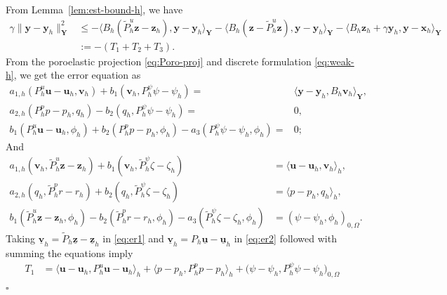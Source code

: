 \documentclass[smallextended]{svjour3}
\renewenvironment{proof}{\noindent{\it Proof.}}{\hfill$\square$}
\numberwithin{equation}{section}
\numberwithin{figure}{section}
\numberwithin{table}{section}
\newcommand{\tP}{\tilde{P}}
\newcommand\buu{\underline{\boldsymbol{u}}}
\newcommand\buv{\underline{\boldsymbol{v}}}
\newcommand\buz{\underline{\boldsymbol{z}}}
\newcommand\bx{\boldsymbol{x}}
\newcommand\by{\boldsymbol{y}}
\newcommand\bu{\boldsymbol{u}}
\newcommand\bv{\boldsymbol{v}}
\newcommand\bz{\boldsymbol{z}}
\newcommand{\bY}{\boldsymbol{Y}}
\begin{document}
\begin{proof}
	From Lemma~\ref{lem:est-bound-h}, we have
	\begin{align*}
		\gamma \| \by - \by_h \|_{\bY}^2 & \le - \langle B_h (\tP_h^u \bz - \bz_h), \by - \by_h \rangle_{\bY}  - \langle B_h( \bz - \tP_h^u \bz), \by - \by_h \rangle_{\bY} -  \langle B_h \bz_h + \gamma \by_h, \by - \bx_h \rangle_{\bY} \\
        & := -(T_1 +T_2 + T_3).
	\end{align*}
	From the poroelastic projection \eqref{eq:Poro-proj} and discrete formulation \eqref{eq:weak-h}, we get the error equation as
	\begin{equation} \label{eq:er1}
		\begin{aligned}
			a_{1,h}(P_h^u \bu - \bu_h, \bv_h)  +  b_1(\bv_h, P_h^{\psi} \psi - \psi_h)     =& \langle \by - \by_h, B_h \bv_h \rangle_{\bY},\\
			a_{2,h}(P_h^p p - p_h, q_h)   -    b_2(q_h, P_h^{\psi} \psi - \psi_h )  =& 0, \qquad \qquad \\
			b_1(P_h^u \bu - \bu_h, \phi_h) + b_2(P_h^p p - p_h, \phi_h) - a_3(P_h^\psi \psi - \psi_h, \phi_h)  =&0; \qquad  \qquad
		\end{aligned}
	\end{equation}
	And
	\begin{equation} \label{eq:er2}
		\begin{aligned}
			a_{1,h}(\bv_h, \tP_h^u \bz - \bz_h) +  b_1(\bv_h, \tP_h^{\psi} \zeta - \zeta_h)     &= \langle \bu - \bu_h, \bv_h \rangle_h,\\
			a_{2,h}(q_h, \tP_h^p r - r_h)   +    b_2(q_h, \tP_h^{\psi} \zeta - \zeta_h)  &= \langle p - p_h, q_h \rangle_h,  \\
			b_1(\tP_h^u \bz - \bz_h, \phi_h)  -  b_2(\tP_h^p r - r_h, \phi_h) - a_3(\tP_h^\psi \zeta - \zeta_h, \phi_h)  &= 
            \left( \psi- \psi_h, \phi_h \right)_{0, \Omega}.
		\end{aligned}
	\end{equation}
	Taking $\buv_h= \tP_h \buz- \buz_h$ in \eqref{eq:er1} and $\buv_h= P_h \buu- \buu_h$ in \eqref{eq:er2} followed with summing the equations imply
	\begin{align*}
		 T_1 &
        = \langle \bu - \bu_h, P_h^u \bu - \bu_h \rangle_h + \langle p - p_h, P_h^p p - p_h \rangle_h  + \big( \psi- \psi_h, P_h^\psi \psi - \psi_h \big)_{0, \Omega}

\end{align*}
\end{proof}
\end{document}
